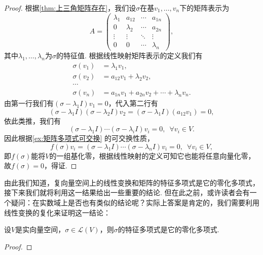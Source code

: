 \begin{enumerate}
          \begin{proof}
              根据\autoref{thm:上三角矩阵存在}，我们设$\sigma$在基$v_1,\ldots,v_n$下的矩阵表示为
              \[A=\begin{pmatrix}
                      \lambda_1 & a_{12}    & \cdots & a_{1n}    \\
                      0         & \lambda_2 & \cdots & a_{2n}    \\
                      \vdots    & \vdots    & \ddots & \vdots    \\
                      0         & 0         & \cdots & \lambda_n
                  \end{pmatrix},\]
              其中$\lambda_1,\ldots,\lambda_n$为$\sigma$的特征值. 根据线性映射矩阵表示的定义我们有
              \begin{align*}
                  \sigma(v_1) & =\lambda_1v_1,                            \\
                  \sigma(v_2) & =a_{12}v_1+\lambda_2v_2,                  \\
                  \cdots                                                  \\
                  \sigma(v_n) & =a_{1n}v_1+a_{2n}v_2+\cdots+\lambda_nv_n.
              \end{align*}
              由第一行我们有$(\sigma-\lambda_1 I)v_1=0$，代入第二行有
              \[(\sigma-\lambda_1 I)(\sigma-\lambda_2 I)v_2=(\sigma-\lambda_1 I)(a_{12}v_1)=0,\]
              依此类推，我们有
              \[(\sigma-\lambda_1 I)\cdots(\sigma-\lambda_i I)v_i=0,\enspace\forall v_i\in V.\]
              因此根据\autoref{ex:矩阵多项式可交换} 的可交换性质，
              \[f(\sigma)v_i=(\sigma-\lambda_1 I)\cdots(\sigma-\lambda_n I)v_i=0,\enspace\forall v_i\in V,\]
              即$f(\sigma)$能将$V$的一组基化零，根据线性映射的定义可知它也能将任意向量化零，故$f(\sigma)=0$，得证.
          \end{proof}
\end{enumerate}

由此我们知道，复向量空间上的线性变换和矩阵的特征多项式是它的零化多项式，接下来我们就将利用这一结果给出一些重要的结论. 但在此之前，或许读者会有一个疑问：在实数域上是否也有类似的结论呢？实际上答案是肯定的，我们需要利用线性变换的复化来证明这一结论：
\begin{theorem}{}{}
    设$V$是实向量空间，$\sigma\in \mathcal{L}(V)$，则$\sigma$的特征多项式是它的零化多项式.
\end{theorem}
\begin{proof}

\end{proof}

